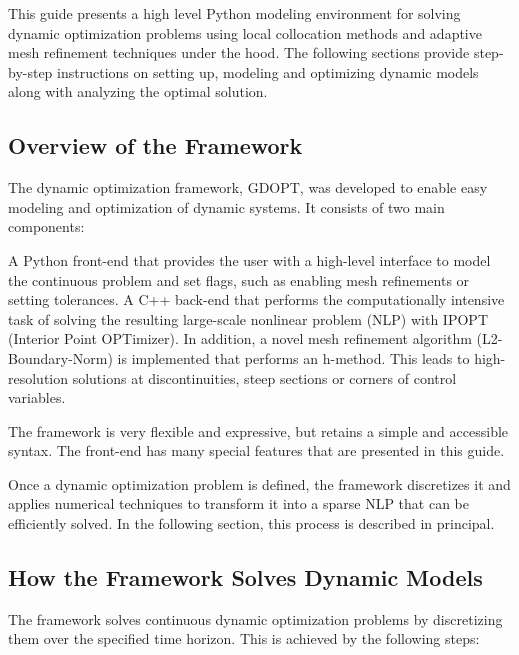 \documentclass[12pt]{article}
\begin{document}
This guide presents a high level Python modeling environment for
solving dynamic optimization problems using local collocation methods and
adaptive mesh refinement techniques under the hood.
The following sections provide
step-by-step instructions on setting up, modeling and optimizing dynamic models
along with analyzing the optimal solution.

\subsection{Overview of the Framework} \label{c:overview}

The dynamic optimization framework, GDOPT, was developed to enable easy
modeling and optimization of dynamic systems. It consists of two main
components:

A Python front-end that provides the user with a high-level interface to model
the continuous problem and set flags, such as enabling mesh refinements or
setting tolerances.
A C++ back-end that performs the computationally intensive task of solving the
resulting large-scale nonlinear problem (NLP) with IPOPT (Interior Point
OPTimizer). In addition, a novel mesh refinement algorithm (L2-Boundary-Norm)
is implemented that performs an h-method. This leads to high-resolution
solutions at discontinuities, steep sections or corners of control variables.

The framework is very flexible and expressive, but retains a simple and
accessible syntax. The front-end has many special features that are presented
in this guide.

Once a dynamic optimization problem is defined, the framework discretizes it
and applies numerical techniques to transform it into a sparse NLP that can be
efficiently solved. In the following section, this process is described in
principal.

\subsection{How the Framework Solves Dynamic Models} \label{c:collocation}

The framework solves continuous dynamic optimization problems by discretizing
them over the specified time horizon. This is achieved by the following steps:
\end{document}
